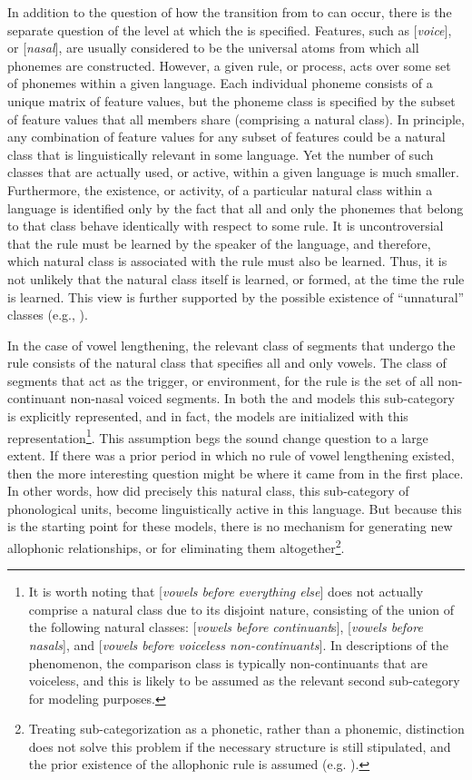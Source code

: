 In addition to the question of how the transition from to can occur, there is the separate question of the
level at which the  is specified. Features, such as {[}\emph{voice}{]},
or {[}\emph{nasal}{]}, are usually considered to be the universal
atoms from which all phonemes are constructed. However, a given rule,
or process, acts over some set of phonemes within a given language.
Each individual phoneme consists of a unique matrix of feature values,
but the phoneme class is specified by the subset of feature values
that all members share (comprising a natural class). In principle,
any combination of feature values for any subset of features could
be a natural class that is linguistically relevant in some language.
Yet the number of such classes that are actually used, or active,
within a given language is much smaller. Furthermore, the existence,
or activity, of a particular natural class within a language is identified
only by the fact that all and only the phonemes that belong to that
class behave identically with respect to some rule. It is uncontroversial
that the rule must be learned by the speaker of the language, and
therefore, which natural class is associated with the rule must also
be learned. Thus, it is not unlikely that the natural class itself
is learned, or formed, at the time the rule is learned. This view
is further supported by the possible existence of “unnatural”
classes (e.g., \citealt{Mielke2008}).

In the case of vowel lengthening, the relevant class of segments that
undergo the rule consists of the natural class that specifies all
and only vowels. The class of segments that act as the trigger, or
environment, for the rule is the set of all non-continuant non-nasal
voiced segments. In both the  and  models
this sub-category is explicitly represented, and in fact, the models
are initialized with this representation\footnote{It is worth noting that {[}\emph{vowels before everything else}{]}
does not actually comprise a natural class due to its disjoint nature,
consisting of the union of the following natural classes: {[}\emph{vowels
before continuant}s{]}, {[}\emph{vowels before nasals}{]}, and {[}\emph{vowels
before voiceless non-continuants}{]}. In descriptions of the phenomenon,
the comparison class is typically non-continuants that are voiceless,
and this is likely to be assumed as the relevant second sub-category
for modeling purposes.}. This assumption begs the sound change question to a large extent.
If there was a prior period in which no rule of vowel lengthening
existed, then the more interesting question might be where it came
from in the first place. In other words, how did precisely this natural
class, this sub-category of phonological units, become linguistically
active in this language. But because this is the starting point for
these models, there is no mechanism for generating new allophonic
relationships, or for eliminating them altogether\footnote{Treating sub-categorization as a phonetic, rather than a phonemic,
distinction does not solve this problem if the necessary structure
is still stipulated, and the prior existence of the allophonic rule
is assumed (e.g. \citealp{dillon2013single}).}. 

